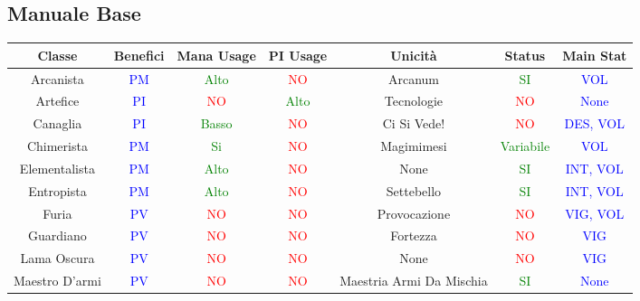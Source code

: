 \documentclass{article}
\begin{document}
\subsection{Manuale Base}
\begin{table}[h]
    \center
    \begin{tabular}{|c|c|c|c|c|c|c|}
      \hline
      \textbf{Classe} & \textbf{Benefici} & \textbf{Mana Usage} & \textbf{PI Usage}  & \textbf{Unicità} & \textbf{Status} & \textbf{Main Stat}\\
      \hline
      \centering Arcanista & \textcolor{blue}{PM} & \textcolor{green}{Alto} & \textcolor{red}{NO} & Arcanum & \textcolor{green}{SI} &\textcolor{blue}{VOL} \\
      \hline
      \centering Artefice & \textcolor{blue}{PI} & \textcolor{red}{NO} & \textcolor{green}{Alto} & Tecnologie & \textcolor{red}{NO} &\textcolor{blue}{None} \\
      \hline
      \centering Canaglia & \textcolor{blue}{PI} & \textcolor{green}{Basso} & \textcolor{red}{NO} & Ci Si Vede! & \textcolor{red}{NO} &\textcolor{blue}{DES, VOL} \\
      \hline
      \centering Chimerista & \textcolor{blue}{PM} & \textcolor{green}{Si} & \textcolor{red}{NO} & Magimimesi & \textcolor{green}{Variabile} &\textcolor{blue}{VOL} \\
      \hline
      \centering Elementalista & \textcolor{blue}{PM} & \textcolor{green}{Alto} & \textcolor{red}{NO} & None & \textcolor{green}{SI} &\textcolor{blue}{INT, VOL} \\
      \hline
      \centering Entropista & \textcolor{blue}{PM} & \textcolor{green}{Alto} & \textcolor{red}{NO} & Settebello & \textcolor{green}{SI} &\textcolor{blue}{INT, VOL} \\
      \hline
      \centering Furia & \textcolor{blue}{PV} & \textcolor{red}{NO} & \textcolor{red}{NO} & Provocazione & \textcolor{red}{NO} &\textcolor{blue}{VIG, VOL} \\
      \hline
      \centering Guardiano & \textcolor{blue}{PV} & \textcolor{red}{NO} & \textcolor{red}{NO} & Fortezza & \textcolor{red}{NO} &\textcolor{blue}{VIG} \\
      \hline
      \centering Lama Oscura & \textcolor{blue}{PV} & \textcolor{red}{NO} & \textcolor{red}{NO} & None & \textcolor{red}{NO} &\textcolor{blue}{VIG} \\
      \hline
      \centering Maestro D'armi & \textcolor{blue}{PV} & \textcolor{red}{NO} & \textcolor{red}{NO} & Maestria Armi Da Mischia & \textcolor{green}{SI} &\textcolor{blue}{None} \\

\end{tabular}
\end{table}
\end{document}
